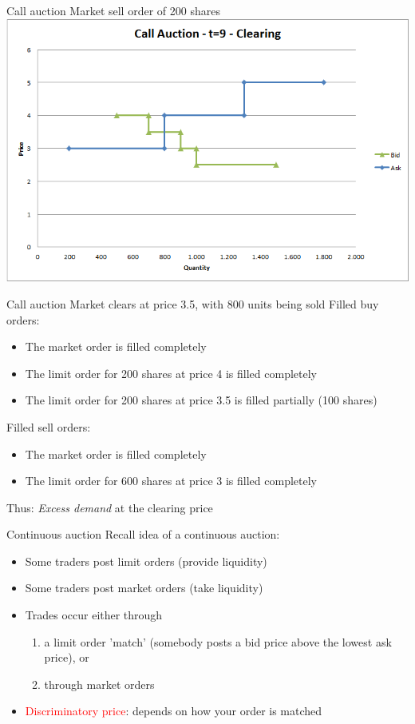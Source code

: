 \documentclass[english,10pt
,aspectratio=169
]{beamer}
\begin{document}
\begin{frame}{Call auction}
	Market sell order of 200 shares
	\quad
	\center
	\includegraphics[width=.75\linewidth]{pics/ch1/Call_Clearing}
\end{frame}


\begin{frame}{Call auction}
	Market clears at price 3.5, with 800 units being sold
	Filled buy orders:
	\begin{itemize}
		\item The market order is filled completely
		\item The limit order for 200 shares at price 4 is filled completely
		\item The limit order for 200 shares at price 3.5 is filled partially (100 shares)
	\end{itemize}
	Filled sell orders:
	\begin{itemize}
		\item The market order is filled completely
		\item The limit order for 600 shares at price 3 is filled completely
	\end{itemize}
	Thus: \textit{Excess demand} at the clearing price
\end{frame}


\begin{frame}{Continuous auction}
	Recall idea of a continuous auction:
	\begin{itemize}
		\item Some traders post limit orders (provide liquidity)
		\item Some traders post market orders (take liquidity)
		\item Trades occur either through 
		\begin{enumerate}
			\item a limit order 'match' (somebody posts a bid price above the lowest ask price), or
			\item through market orders
		\end{enumerate}
		\item \textcolor{red}{Discriminatory price}: depends on how your order is matched
	\end{itemize}
\end{frame}
\end{document}
